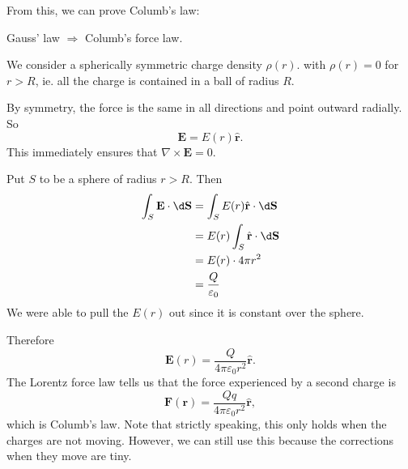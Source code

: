 \documentclass[a4paper]{article}
\begin{document}
From this, we can prove Columb's law:
\begin{eg}
  Gauss' law $\Rightarrow$ Columb's force law.

  We consider a spherically symmetric charge density $\rho (r)$. with $\rho (r) = 0$ for $r > R$, ie. all the charge is contained in a ball of radius $R$.

  \begin{center}
  \end{center}

  By symmetry, the force is the same in all directions and point outward radially. So
  \[
    \mathbf{E} = E(r) \hat{\mathbf{r}}.
  \]
  This immediately ensures that $\nabla \times \mathbf{E} = 0$.

  Put $S$ to be a sphere of radius $r > R$. Then
  \begin{align*}
    \int_S \mathbf{E}\cdot \d \mathbf{S} &= \int_S E(r) \hat{\mathbf{r}}\cdot \d \mathbf{S}\\
    &= E(r) \int_S \hat{\mathbf{r}}\cdot \d \mathbf{S}\\
    &= E(r)\cdot 4\pi r^2\\
    &= \frac{Q}{\varepsilon_0}
  \end{align*}
  We were able to pull the $E(r)$ out since it is constant over the sphere.

  Therefore
  \[
    \mathbf{E}(r) = \frac{Q}{4\pi\varepsilon_0 r^2}\hat{\mathbf{r}}.
  \]
  The Lorentz force law tells us that the force experienced by a second charge is
  \[
    \mathbf{F}(\mathbf{r}) = \frac{Qq}{4\pi\varepsilon_0 r^2}\hat{\mathbf{r}},
  \]
  which is Columb's law. Note that strictly speaking, this only holds when the charges are not moving. However, we can still use this because the corrections when they move are tiny.
\end{eg}
\end{document}

